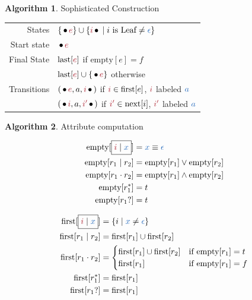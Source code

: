 \documentclass[10pt, landscape]{article}
\theoremstyle{definition}
\newtheorem{algorithm}{Algorithm}[section]
\newcommand{\AttrOf}[2]{\text{#1}[#2]}
\newcommand{\FirstAttr}[1]{\AttrOf{first}{#1}}
\newcommand{\EmptyAttr}[1]{\AttrOf{empty}{#1}}
\newcommand{\LastAttr}[1]{\AttrOf{last}{#1}}
\newcommand{\NextAttr}[1]{\AttrOf{next}{#1}}
\newcommand{\termcolor}{NavyBlue}
\newcommand{\termA}{\textcolor{\termcolor}{a}}
\newcommand{\termX}{\textcolor{\termcolor}{x}}
\newcommand{\termEps}{\textcolor{\termcolor}{\epsilon}}
\begin{document}
\begin{multicols*}{3}
{  \begin{algorithm}{Sophisticated Construction}

    \begin{tabular}{r l}
      States      &$\{ \Left{e} \} \cup \{\Right{i} \mid i \text{ is Leaf}\neq \termEps\}$ \\
      Start state & $\Left{e}$ \\
      Final State & $\LastAttr{\Rx{e}}$ if $\EmptyAttr{e} = f$\\
                  & $\LastAttr{\Rx{e}} \cup \{\Left{e}\}$ otherwise \\
    Transitions & $(\Left{e}, a, \Right{i})$ if $\Rx{i} \in \FirstAttr{e}$, $\Rx{i}$ labeled $\termA$ \\
                  & $(\Left{i}, a, \Right{i'})$ if $\Rx{i'} \in \NextAttr{i}$, $\Rx{i'}$ labeled $\termA$
    \end{tabular}
  \end{algorithm}

  \columnbreak

  \begin{algorithm}{Attribute computation}


    \begin{align*}
      \EmptyAttr{\Leaf{i}{\termX}} &= \termX \equiv \termEps  \\
      \EmptyAttr{r_{1} \mid r_{2}} &= \EmptyAttr{r_{1}} \lor \EmptyAttr{r_{2}} \\
      \EmptyAttr{r_{1} \cdot r_{2}} &= \EmptyAttr{r_{1}} \land \EmptyAttr{r_{2}} \\
      \EmptyAttr{r_{1}^{*}} &= t \\
      \EmptyAttr{r_{1}?} &= t
    \end{align*}

    \begin{align*}
      \FirstAttr{\Leaf{i}{\termX}} &= \{ i \mid \termX \neq \termEps \}\\
      \FirstAttr{r_{1} \mid r_{2}} &= \FirstAttr{r_{1}} \cup \FirstAttr{r_{2}} \\
      \FirstAttr{r_{1} \cdot r_{2}} &= \begin{cases}
                                          \FirstAttr{r_{1}} \cup \FirstAttr{r_{2}} & \text{if } \EmptyAttr{r_{1}} = t \\
                                          \FirstAttr{r_{1}}                          & \text{if } \EmptyAttr{r_{1}} = f
                                        \end{cases} \\
      \FirstAttr{r_{1}^{*}} &= \FirstAttr{r_{1}} \\
      \FirstAttr{r_{1}?} &= \FirstAttr{r_{1}}
    \end{align*}


\end{algorithm}}
\end{multicols*}
\end{document}
